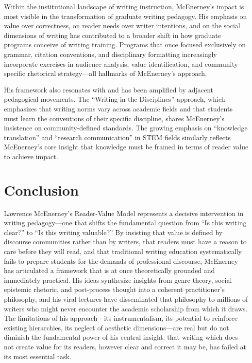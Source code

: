 \documentclass[12pt]{article}
\begin{document}
Within the institutional landscape of writing instruction, McEnerney's impact is most visible in the transformation of graduate writing pedagogy. His emphasis on value over correctness, on reader needs over writer intentions, and on the social dimensions of writing has contributed to a broader shift in how graduate programs conceive of writing training. Programs that once focused exclusively on grammar, citation conventions, and disciplinary formatting increasingly incorporate exercises in audience analysis, value identification, and community-specific rhetorical strategy---all hallmarks of McEnerney's approach.

His framework also resonates with and has been amplified by adjacent pedagogical movements. The ``Writing in the Disciplines'' approach, which emphasizes that writing norms vary across academic fields and that students must learn the conventions of their specific discipline, shares McEnerney's insistence on community-defined standards. The growing emphasis on ``knowledge translation'' and ``research communication'' in STEM fields similarly reflects McEnerney's core insight that knowledge must be framed in terms of reader value to achieve impact.

\section*{Conclusion}

Lawrence McEnerney's Reader-Value Model represents a decisive intervention in writing pedagogy---one that shifts the fundamental question from ``Is this writing clear?'' to ``Is this writing valuable?'' By insisting that value is defined by discourse communities rather than by writers, that readers must have a reason to care before they will read, and that traditional writing education systematically fails to prepare students for the demands of professional discourse, McEnerney has articulated a framework that is at once theoretically grounded and immediately practical. His ideas synthesize insights from genre theory, social-epistemic rhetoric, and post-process thought into a coherent practitioner's philosophy, and his viral lectures have disseminated that philosophy to millions of writers who might never encounter the academic scholarship from which it draws. The limitations of his approach---its instrumentalism, its potential to reinforce existing hierarchies, its neglect of aesthetic dimensions---are real but do not diminish the fundamental power of his central insight: that writing which does not create value for its readers, however clear and correct it may be, has failed at its most essential task.
\end{document}
